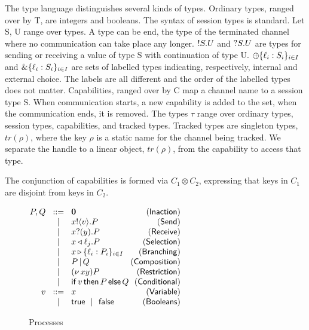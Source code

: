 The type language distinguishes several kinds of types. Ordinary types, ranged over by T, are integers and booleans. The syntax of session types is standard.  Let S, U range over types. A type can be end, the type of the terminated channel where no communication can take place any longer. ${}!S. U$ and ${}?S. U$ are types for sending or receiving a value of type S with continuation of type U.  $\oplus\{{\ell}_i: {S}_i\}_{i\in I}$ and $ \&\{{\ell}_i\mathrel:{S}_i\}_{i\in I}$ are sets of labelled types indicating, respectively, internal and external choice. The labels are all different and the order of the labelled types does not matter. Capabilities, ranged over by C map a channel name to a session type S. When communication starts, a new capability is added to the set, when the communication ends, it is removed. The types $\tau$ range over ordinary types, session types, capabilities, and tracked types. Tracked types are singleton types, $tr(\rho)$, where the key $\rho$ is a static name for the channel being tracked. We separate the handle to a linear object, $tr(\rho)$, from the capability to access that type.

The conjunction of capabilities is formed via $C_1 \otimes C_2$, expressing that keys in $C_1$ are disjoint from keys in $C_2$.



\begin{figure}[H]
  \centering
  $
  	\arraycolsep=1pt
  	\begin{array}{rclr}
  		P, Q &\bnfis& \nil & \Inact
  		\\
  		&\bnfbar& \pout{x}{v} P & \Send
      \\
      &\bnfbar& \pin{x}{y} P & \Rcv
      \\
  		& \bnfbar & \sel{x}{\ell_j} P & \Selection
      \\
      &\bnfbar& \branch{x}{\ell_i: P_i}_{i \in I} & \Branching
      \\
      &\bnfbar& P\pll Q & \Composition
  		\\
      &\bnfbar& \newn{xy} P& \Restriction
  		\\
      &\bnfbar& \cond{v}{P}{Q}& \Conditional
      \\
      v &\bnfis& x & \Variable
      \\
      &\bnfbar& \true \bnfbar \false & \Booleans
  	\end{array}
  $
\caption{Processes}\label{types}
\end{figure}

